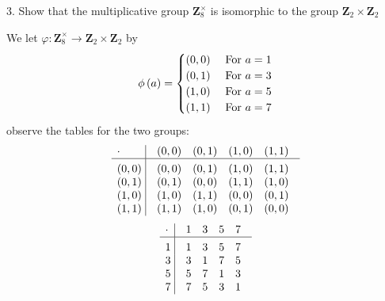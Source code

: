 \newpage
\begin{mdframed}[style=darkQuesion]
3. Show that the multiplicative group $\mathbf{Z}_{8}^{\times}$ is isomorphic to the group $\mathbf{Z}_{2} \times \mathbf{Z}_{2}$
\end{mdframed}
\begin{mdframed}[style=darkAnswer,frametitle={Joe Starr}]
We let $\varphi: \mathbf{Z}_{8}^{\times} \to \mathbf{Z}_{2} \times \mathbf{Z}_{2}$
 by  
 \begin{equation}
  \phi\left(a\right)=
  \begin{cases}
      \left(0,0\right)  & \text{ For } a=1\\
      \left(0,1\right)  & \text{ For } a=3\\
      \left(1,0\right)  & \text{ For } a=5\\
      \left(1,1\right)  & \text{ For } a=7
  \end{cases}
\end{equation}
observe the tables for the two groups: 
$$\vbox{\tabskip0.5em\offinterlineskip
      \halign{\strut$#$\hfil\ \tabskip1em\vrule&&$#$\hfil\cr
          \cdot      & \lrp{0,0}  & \lrp{0,1}   & \lrp{1,0}   & \lrp{1,1}  \cr
          \noalign{\hrule}\vrule height 12pt width 0pt
          \lrp{0,0}  & \lrp{0,0}  & \lrp{0,1}   & \lrp{1,0}   & \lrp{1,1}    \cr
          \lrp{0,1}  & \lrp{0,1}  & \lrp{0,0}   & \lrp{1,1}   & \lrp{1,0}    \cr
          \lrp{1,0}  & \lrp{1,0}  & \lrp{1,1}   & \lrp{0,0}   & \lrp{0,1}    \cr
          \lrp{1,1}  & \lrp{1,1}  & \lrp{1,0}   & \lrp{0,1}   & \lrp{0,0}    \cr
        }}$$
        $$\vbox{\tabskip0.5em\offinterlineskip
      \halign{\strut$#$\hfil\ \tabskip1em\vrule&&$#$\hfil\cr
          \cdot      & 1  & 3   & 5   & 7  \cr
          \noalign{\hrule}\vrule height 12pt width 0pt
          1  & 1  & 3   & 5   & 7    \cr
          3  & 3  & 1   & 7   & 5    \cr
          5  & 5  & 7   & 1   & 3    \cr
          7  & 7  & 5   & 3   & 1    \cr
        }}$$
\end{mdframed}
\newpage
